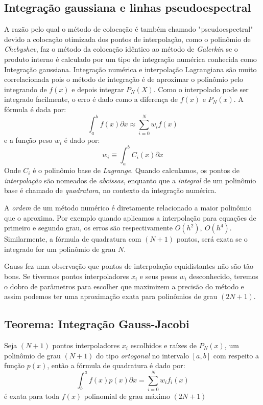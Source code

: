 \subsection{Integração gaussiana e linhas pseudoespectral}
 A razão pelo qual o método de colocação é também chamado "pseudoespectral" devido a colocação otimizada dos pontos de interpolação, como o polinômio de \emph{Chebyshev}, faz o método da colocação idêntico ao método de \emph{Galerkin} se o produto interno é calculado por um tipo de integração numérica conhecida como Integração gaussiana. 
 Integração numérica e interpolação Lagrangiana são muito correlacionada pois o método de integração é de aproximar o polinômio pelo integrando de $f(x)$ e depois integrar $P_N(X)$. Como o interpolado pode ser integrado facilmente, o erro é dado como a diferença de $f(x)$ e $P_N(x)$.  A fórmula é dada por:
 \begin{equation}
  \int_a^b f(x) \partial x \approx \sum_{i = 0}^N w_i f(x)
 \end{equation}
 e a função peso $w_i$ é dado por:
 \begin{equation}
  w_i \equiv \int_{a}^{b} C_i(x) \partial x
 \end{equation}
 Onde $C_i$ é o polinômio base de \emph{Lagrange}.
 Quando calculamos, os pontos de \emph{interpolação} são nomeados de \emph{abcissas}, enquanto que a \emph{integral} de um polinômio base é chamado de \emph{quadratura}, no contexto da integração numérica.
 
 A \emph{ordem} de um método numérico é diretamente relacionado a maior polinômio que o aproxima. Por exemplo quando aplicamos a interpolação para equações de primeiro e segundo grau, os erros são respectivamente $O(h^2),\ O(h^4)$. Similarmente, a fórmula de quadratura com $(N + 1)$ pontos, será exata se o integrado for um polinômio de grau $N$.
 
 Gauss fez uma observação que pontos de interpolação equidistantes não são tão bons. Se tivermos pontos interpoladores $x_i$ e seus pesos $w_i$ 
desconhecido, teremos o dobro de parâmetros para escolher que maximizem a precisão do método e assim podemos ter uma aproximação exata para polinômios de grau $(2N + 1)$.
\subsection{Teorema: Integração Gauss-Jacobi}
 Seja $(N + 1)$ pontos interpoladores $x_i$ escolhidos e raízes de $P_N(x)$, um polinômio de grau $(N+1)$ do tipo \emph{ortogonal} no intervalo $[a,b]$ com respeito a função $p(x)$, então a fórmula de quadratura é dado por:
\begin{equation}
 \int^a_b f(x)p(x) \partial x = \sum^{N}_{i= 0} w_i f_i(x)
\end{equation} 
é exata para toda $f(x)$ polinomial de grau máximo $(2N +1)$

